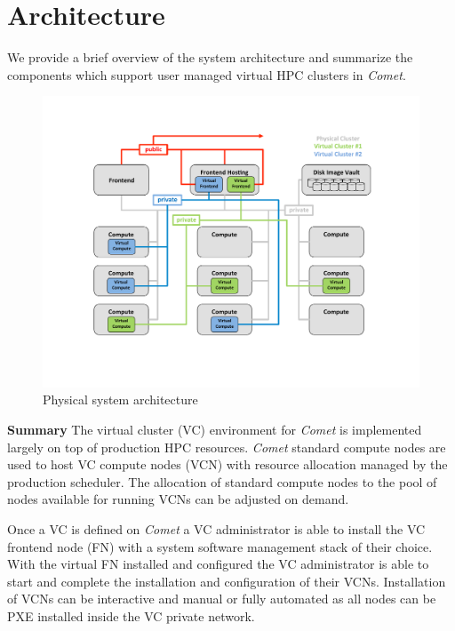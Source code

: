 
\section{Architecture} \label{S:architecture}

We provide a brief overview of the system architecture and summarize
the components which support user managed virtual HPC clusters in {\em
  Comet}.

\begin{figure}[!h]
\vspace{-.5cm}
   \hspace{-1.5cm} \includegraphics[width=1.3\columnwidth]{images/arch1}
\vspace{-1.5cm}

    \caption{Physical system architecture}
    \label{F:comet-arch1}
\end{figure}

{\parindent 0pt \bf Summary} The virtual cluster (VC) environment for {\em
Comet\/} is implemented largely on top of production HPC resources. {\em
Comet\/} standard compute nodes are used to host VC compute nodes (VCN) with
resource allocation managed by the production scheduler. The allocation of
standard compute nodes to the pool of nodes available for running VCNs can be
adjusted on demand.

Once a VC is defined on {\em Comet\/} a VC administrator is able to install the
VC frontend node (FN) with a system software management stack of their choice.
With the virtual FN installed and configured the VC administrator is able to start and
complete the installation and configuration of their VCNs. Installation of VCNs
can be interactive and manual or fully automated as all nodes can be PXE
installed inside the VC private network.

